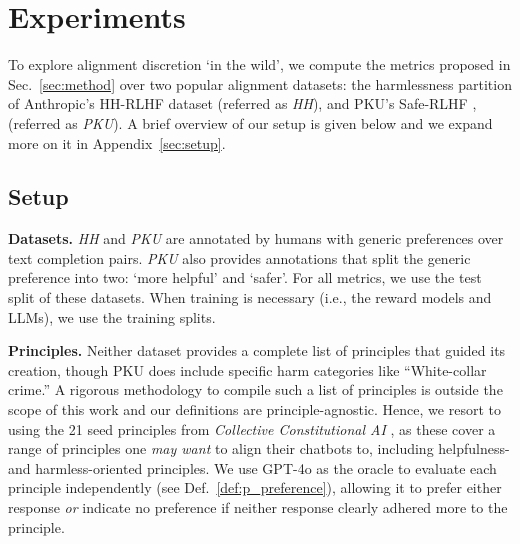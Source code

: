 \documentclass{article}
\begin{document}
 











\section{Experiments}\label{sec:experiments}
To explore alignment discretion `in the wild', we compute the metrics proposed in Sec.~\ref{sec:method} over two popular alignment datasets: the harmlessness partition of Anthropic's HH-RLHF dataset \cite{bai2022traininghelpfulharmlessassistant} (referred as \textit{HH}), and PKU's Safe-RLHF \cite{ji2024pkusaferlhfsafetyalignmentpreference}, (referred as \textit{PKU}). A brief overview of our setup is given below and we expand more on it in Appendix~\ref{sec:setup}.

\subsection{Setup}

\noindent\textbf{Datasets.} \textit{HH} and \textit{PKU} are annotated by humans with generic preferences over text completion pairs. \textit{PKU} also provides annotations that split the generic preference into two: `more helpful' and `safer'.
For all metrics, we use the test split of these datasets. 
When training is necessary (i.e., the reward models and LLMs), we use the training splits. 

\noindent\textbf{Principles.} 
Neither dataset provides a complete list of principles  that guided its creation, though PKU does include specific harm categories like ``White-collar crime.'' 
A rigorous methodology to compile such a list of principles is outside the scope of this work and our definitions are principle-agnostic.
Hence, we resort to using the 21 seed principles from \textit{Collective Constitutional AI} \cite{huang2024collective}, as these cover a range of principles one \textit{may want} to align their chatbots to, including helpfulness- and harmless-oriented principles.
We use GPT-4o as the oracle to evaluate each principle independently (see Def.~\ref{def:p_preference}), allowing it to prefer either response \emph{or} indicate no preference if neither response clearly adhered more to the principle.
\end{document}
